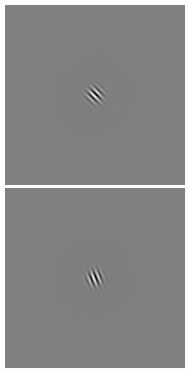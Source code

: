 \begin{figure}[ht]
\begin{center}
 \includegraphics[width=\columnwidth/9]{ch4/figures/iGabor1_6.jpg}
 \includegraphics[width=\columnwidth/9]{ch4/figures/iGabor1_7.jpg}\\

\end{center}
\end{figure}
